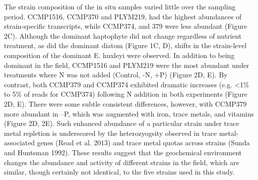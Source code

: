 The strain composition of the in situ samples varied little over the sampling period. CCMP1516, CCMP370 and PLYM219, had the highest abundances of strain-specific transcripts, while CCMP374, and 379 were less abundant (Figure 2C). Although the dominant haptophyte did not change regardless of nutrient treatment, as did the dominant diatom (Figure 1C, D), shifts in the strain-level composition of the dominant E. huxleyi were observed. In addition to being dominant in the field, CCMP1516 and PLYM219 were the most abundant under treatments where N was not added (Control, -N, +P) (Figure 2D, E). By contrast, both CCMP379 and CCMP374 exhibited dramatic increases (e.g. <1\% to 5\% of reads for CCMP374) following N addition in both experiments (Figure 2D, E). There were some subtle consistent differences, however, with CCMP379 more abundant in –P, which was augmented with iron, trace metals, and vitamins (Figure 2D, 2E). Such enhanced abundance of a particular strain under trace metal repletion is underscored by the heterozyogsity observed in trace metal-associated genes (Read et al. 2013) and trace metal quotas across strains (Sunda and Huntsman 1992). These results suggest that the geochemical environment changes the abundance and activity of different strains in the field, which are similar, though certainly not identical, to the five strains used in this study.  
